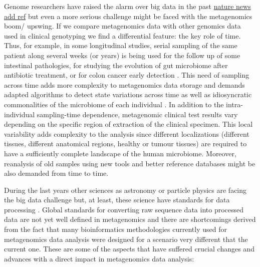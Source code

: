 \documentclass{frontiersSCNS} %
\begin{document}
Genome researchers have raised the alarm over big data in the past
\href{http://www.nature.com/news/genome-researchers-raise-alarm-over-big-data-1.17912}{nature
news add ref} but even a more serious challenge might be faced with the
metagenomics boom/ upswing. If we compare metagenomics data with other
genomics data used in clinical genotyping we find a differential
feature: the key role of time. Thus, for example, in some longitudinal
studies, serial sampling of the same patient along several weeks (or
years) is being used for the follow up of some intestinal pathologies,
for studying the evolution of gut microbiome after antibiotic treatment,
or for colon cancer early detection \citep{zeller2014potential}. This
need of sampling across time adds more complexity to metagenomics data
storage and demands adapted algorithms to detect state variations across
time as well as idiosyncratic commonalities of the microbiome of each
individual \citep{franzosa2015identifying}. In addition to the
intra-individual sampling-time dependence, metagenomic clinical test
results vary depending on the specific region of extraction of the
clinical specimen. This local variability adds complexity to the
analysis since different localizations (different tissues, different
anatomical regions, healthy or tumour tissues) are required to have a
sufficiently complete landscape of the human microbiome. Moreover,
reanalysis of old samples using new tools and better reference databases
might be also demanded from time to time.

During the last years other sciences as astronomy or particle physics
are facing the big data challenge but, at least, these science have
standards for data processing \citep{stephens2015big}. Global standards
for converting raw sequence data into processed data are not yet well
defined in metagenomics and there are shortcomings derived from the fact
that many bioinformatics methodologies currently used for metagenomics
data analysis were designed for a scenario very different that the
current one. These are some of the aspects that have suffered crucial
changes and advances with a direct impact in metagenomics data analysis:
\end{document}
